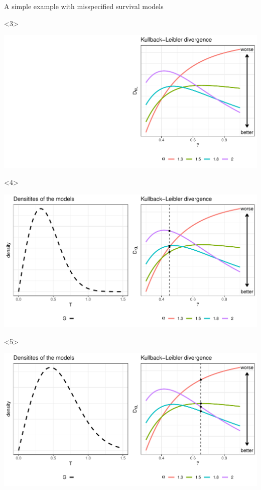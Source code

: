 \documentclass[smaller]{beamer}\usepackage{listings}
\begin{document}
\begin{frame}[label={sec:org2cc3300}]{A simple example with misspecified survival models}
\begin{onlyenv}<3>
\begin{center}
\includegraphics[width=.9\linewidth]{fig-mix-const-v3.pdf}
\end{center}
\end{onlyenv}


\begin{onlyenv}<4>
\begin{center}
\includegraphics[width=.9\linewidth]{fig-mix-const-v4.pdf}
\end{center}
\end{onlyenv}

\begin{onlyenv}<5>
\begin{center}
\includegraphics[width=.9\linewidth]{fig-mix-const-v5.pdf}
\end{center}
\end{onlyenv}
\end{frame}
\end{document}
